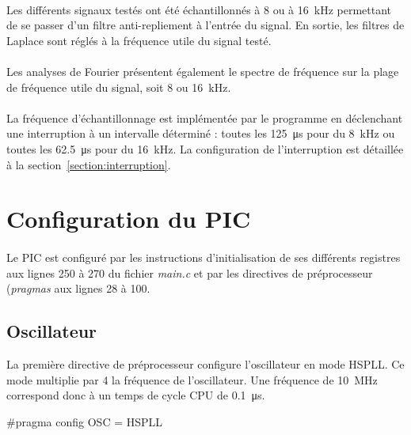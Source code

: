 \documentclass{article}
\begin{document}
    \paragraph{}
    Les différents signaux testés ont été échantillonnés à 8 ou à \SI{16}{\kilo\hertz} permettant de se passer d'un filtre anti-repliement à l'entrée du signal. En sortie, les filtres de Laplace sont réglés à la fréquence utile du signal testé.

    \paragraph{}
    Les analyses de Fourier présentent également le spectre de fréquence sur la plage de fréquence utile du signal, soit 8 ou \SI{16}{\kilo\hertz}.

    \paragraph{}
    La fréquence d'échantillonnage est implémentée par le programme en déclenchant une interruption à un intervalle déterminé : toutes les \SI{125}{\micro\second} pour du \SI{8}{\kilo\hertz} ou toutes les \SI{62.5}{\micro\second} pour du \SI{16}{\kilo\hertz}. La configuration de l'interruption est détaillée à la section~\ref{section:interruption}.


    \newpage
    \section{Configuration du PIC}
    \label{section:configuration}

    \paragraph{}
    Le PIC est configuré par les instructions d'initialisation de ses différents registres aux lignes 250 à 270 du fichier \emph{main.c} et par les directives de préprocesseur (\emph{pragmas} aux lignes 28 à 100.

    \subsection{Oscillateur}
    La première directive de préprocesseur configure l'oscillateur en mode HSPLL. Ce mode multiplie par 4 la fréquence de l'oscillateur. Une fréquence de \SI{10}{\mega\hertz} correspond donc à un temps de cycle CPU de \SI{0.1}{\micro\second}.
    \begin{verbatimtab}
     [29]    #pragma config OSC = HSPLL
    \end{verbatimtab}
\end{document}
